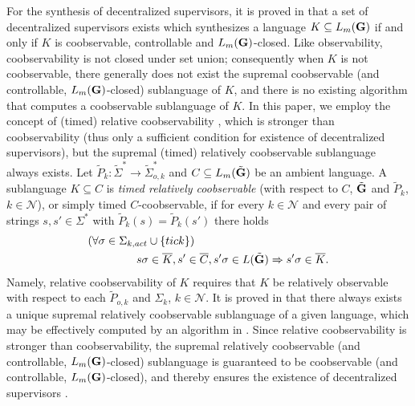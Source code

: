  For the synthesis of decentralized supervisors,
it is proved in \cite{RudWon:1992,ParkChoi09} that a set of decentralized supervisors exists
which synthesizes a language $K\subseteq L_m({\bf G})$ if and only if $K$
is coobservable, controllable and $L_m({\bf G})$-closed. Like observability, coobservability is not closed under
set union; consequently when $K$ is not coobservable, there generally does not exist the supremal coobservable
(and controllable, $L_m({\bf G})$-closed) sublanguage of $K$, and there is no
existing algorithm that computes a coobservable sublanguage of $K$. In this paper, we employ the concept
of (timed) relative coobservability \cite{CaiZW16}, which is stronger
than coobservability (thus only a sufficient condition for existence of
decentralized supervisors), but the supremal (timed) relatively coobservable sublanguage always exists.
Let $\tilde P_k: \tilde\Sigma^* \rightarrow \tilde\Sigma^*_{o,k}$ and $C \subseteq L_m(\tilde{\bf G})$
be an ambient language. A sublanguage $K \subseteq C$ is {\it timed relatively coobservable} (with respect to $C$, $\tilde{\bf G}$
and $\tilde P_k$, $k \in \mathcal{N}$), or simply timed $C$-coobservable, if
for every $k \in \mathcal{N}$ and
every pair of strings $s,s' \in \Sigma^*$ with $\tilde P_k (s) = \tilde P_k (s')$
there holds
\begin{align*}
&(\forall \sigma \in{\Sigma_{k,act}\cup\{tick\}}) \\
 &~~~~~~~~~~~~~s\sigma \in \overline{K}, s' \in \overline{C},
s'\sigma \in L(\tilde{\bf G}) \Rightarrow s'\sigma \in \overline{K}.
\end{align*}
Namely, relative coobservability of $K$ requires that $K$ be relatively observable with
respect to each $\tilde P_{o,k}$ and $\Sigma_k$, $k \in \mathcal{N}$.
It is proved in
\cite{CaiZW16} that there always exists a unique supremal
relatively coobservable sublanguage of a given language, which may be effectively computed  by an algorithm in \cite{CaiZW16}. Since relative coobservability is stronger
than coobservability, the supremal relatively coobservable (and controllable, $L_m({\bf G})$-closed) sublanguage is guaranteed
to be coobservable (and controllable, $L_m({\bf G})$-closed), and
thereby ensures the existence of decentralized supervisors \cite{RudWon:1992,ParkChoi09}. 

